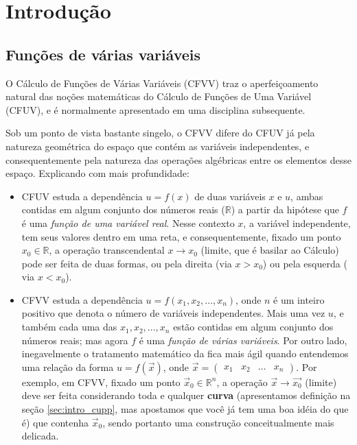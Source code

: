 

\chapter{Introdução}\label{chap:introducao}

\section{Funções de várias variáveis} \label{sec:intro_cfvv}

O Cálculo de Funções de Várias Variáveis (CFVV) traz o aperfeiçoamento natural das noções matemáticas do Cálculo de Funções de Uma Variável (CFUV), e é normalmente apresentado em uma disciplina subsequente. 

Sob um ponto de vista bastante singelo, o CFVV difere do CFUV já pela natureza geométrica do espaço que contém as variáveis independentes, e consequentemente pela natureza das operações algébricas entre os elementos desse espaço. Explicando com mais profundidade:
\begin{itemize}
\item{CFUV estuda a dependência $u=f(x)$ de duas variáveis $x$ e $u$, ambas contidas em algum conjunto dos números reais ($\mathbb{R}$) a partir da hipótese que $f$ é uma {\it função de uma variável real}. Nesse contexto $x$, a variável independente, tem seus valores dentro em uma reta, e consequentemente, fixado um ponto $x_0 \in \mathbb{R}$, a operação transcendental $x \rightarrow x_0$ (limite, que é basilar ao Cálculo) pode ser feita de duas formas, ou pela direita (via $x>x_0$) ou pela esquerda ( via $x < x_0$).  }
\item{CFVV estuda a dependência $u=f(x_1,x_2,\dots,x_n)$, onde $n$ é um inteiro positivo que denota o número de variáveis independentes. Mais uma vez $u$, e também cada uma das $x_1, x_2, \dots, x_n$ estão contidas em algum conjunto dos números reais; mas agora $f$ é uma {\it função de várias variáveis}. Por outro lado, inegavelmente o tratamento matemático da fica mais ágil quando entendemos uma relação da forma $u = f(\vec{x})$, onde $\vec{x} = \left( \begin{array}{cccc} x_1 & x_2 & \dots &x_n \end{array} \right)$. Por exemplo, em CFVV, fixado um ponto $\vec{x}_0 \in \mathbb{R}^n$, a operação $\vec{x} \rightarrow \vec{x_0}$ (limite) deve ser feita considerando toda e qualquer {\bf curva} (apresentamos definição na seção \ref{sec:intro_cupp}, mas apostamos que você já tem uma boa idéia do que é) que contenha $\vec{x}_0$, sendo portanto uma construção conceitualmente mais delicada.}
\end{itemize} 


